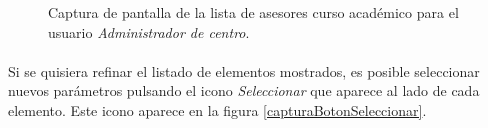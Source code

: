   \begin{figure}[!ht]
    \begin{center}
      \caption{Captura de pantalla de la lista de asesores curso académico para el usuario \textit{Administrador de centro}.}
      \label{capturaPantallaListaAsesoresCAAdminCentro}
    \end{center}
  \end{figure}

  \paragraph{}Si se quisiera refinar el listado de elementos mostrados, es
  posible seleccionar nuevos parámetros pulsando el icono \textit{Seleccionar}
  que aparece al lado de cada elemento. Este icono aparece en la figura
  \ref{capturaBotonSeleccionar}.